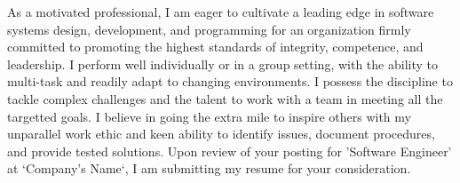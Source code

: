 \documentclass[11pt, a4paper]{awesome-cv}
\begin{document}
\begin{cvletter}
	As a motivated professional, I am eager to cultivate a leading edge in software systems design, development, and programming for an organization firmly committed to promoting the highest standards of integrity, competence, and leadership. I perform well individually or in a group setting, with the ability to multi-task and readily adapt to changing environments. I possess the discipline to tackle complex challenges and the talent to work with a team in meeting all the targetted goals. I believe in going the extra mile to inspire others with my unparallel work ethic and keen ability to identify issues, document procedures, and provide tested solutions. Upon review of your posting for 'Software Engineer' at `Company's Name`, I am submitting my resume for your consideration.

\end{cvletter}

\makeletterclosing
\end{document}
